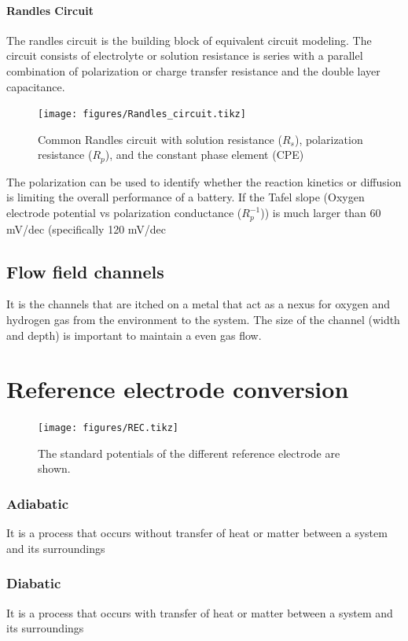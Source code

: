\documentclass[12pt]{book}
\begin{document}
\paragraph{Randles Circuit}
The randles circuit is the building block of equivalent circuit modeling. The circuit consists of electrolyte or solution resistance is series with a parallel combination of polarization or charge transfer resistance and the double layer capacitance. 
\begin{center}
\begin{figure}[htb!]
	\centering
	\texttt{[image: figures/Randles\_circuit.tikz]}
	\caption{Common Randles circuit with solution resistance ($R_s$), polarization resistance ($R_p$), and the constant phase element (CPE)}
	\end{figure}
\end{center}
The polarization can be used to identify whether the reaction kinetics or diffusion is  limiting the overall performance of a battery. If the Tafel slope (Oxygen electrode potential vs polarization conductance ($R_p^{-1}$)) is much larger than 60 mV/dec (specifically 120 mV/dec
\subsection{Flow field channels}
It is the channels that are itched on a metal that act as a nexus for oxygen and hydrogen gas from the environment to the system. The size of the channel (width and depth) is important to maintain a even gas flow.

\section{Reference electrode conversion}
\begin{figure}[htb!]
	\centering
	\texttt{[image: figures/REC.tikz]}
	\caption{The standard potentials of the different reference electrode are shown.}
\end{figure}
\subsubsection{Adiabatic}
It is a process that occurs without transfer of heat or matter between a system and its surroundings
\subsubsection{Diabatic}
It is a process that occurs with transfer of heat or matter between a system and its surroundings
\end{document}
